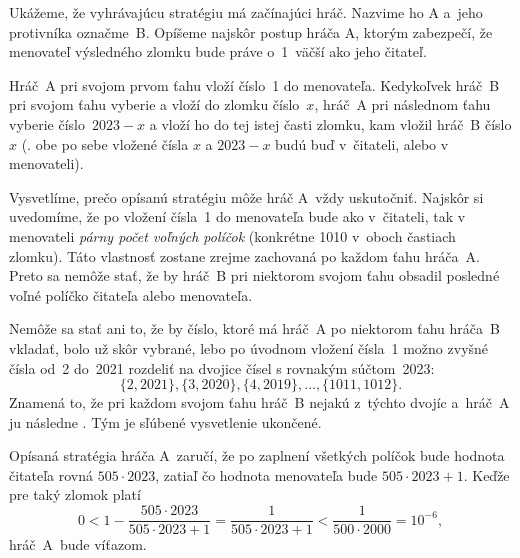 {%
Ukážeme, že vyhrávajúcu stratégiu má začínajúci hráč.
Nazvime ho A a~jeho protivníka označme~B. Opíšeme najskôr postup
hráča A, ktorým zabezpečí, že menovateľ výsledného zlomku bude
práve o~1~väčší ako jeho čitateľ.

Hráč~A pri svojom prvom ťahu vloží číslo~1 do menovateľa.
Kedykoľvek hráč~B pri svojom ťahu vyberie a vloží do zlomku číslo~$x$,
hráč~A pri následnom ťahu vyberie číslo~$2023-x$ a vloží ho do tej istej
časti zlomku, kam vložil hráč~B číslo $x$ (\tj. obe po sebe
vložené čísla $x$ a $2023-x$ budú buď v~čitateli, alebo v menovateli).

Vysvetlíme, prečo opísanú stratégiu môže hráč A~vždy uskutočniť.
Najskôr si uvedomíme, že po vložení čísla~1 do menovateľa
bude ako v~čitateli, tak v menovateli {\em párny počet voľných
políčok} (konkrétne 1010 v~oboch častiach zlomku). Táto vlastnosť
zostane zrejme zachovaná po každom ťahu hráča~A.
Preto sa nemôže stať, že by hráč~B pri niektorom svojom ťahu obsadil
posledné voľné políčko čitateľa alebo menovateľa.

Nemôže sa stať ani to, že by číslo, ktoré má hráč~A po niektorom ťahu
hráča~B vkladať, bolo už skôr vybrané,
lebo po úvodnom vložení čísla~1 možno
zvyšné čísla od~2 do~2021 rozdeliť na dvojice čísel s rovnakým
súčtom~2023:
$$
\{2, 2021\}, \{3, 2020\}, \{4, 2019\}, \ldots, \{1011, 1012\}.
$$
Znamená to, že pri každom svojom ťahu hráč~B nejakú z~týchto
dvojíc  a~hráč~A ju následne .
Tým je sľúbené vysvetlenie ukončené.

Opísaná stratégia hráča A~zaručí, že po zaplnení všetkých políčok
bude hodnota čitateľa rovná $505\cdot2023$, zatiaľ čo hodnota
menovateľa bude $505\cdot2023+1$. Keďže pre taký zlomok
platí
$$
0<1-\frac{505\cdot2023}{505\cdot2023+1}
=\frac{1}{505\cdot2023+1}<\frac{1}{500\cdot2000}=10^{-6},
$$
hráč~A~bude víťazom.
}

